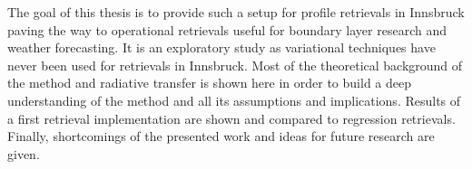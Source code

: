     The goal of this thesis is to provide such a setup for profile retrievals
    in Innsbruck paving the way to operational retrievals useful for boundary
    layer research and weather forecasting. It is an exploratory study as
    variational techniques have never been used for retrievals in Innsbruck.
    Most of the theoretical background of the method and radiative transfer
    is shown here in order to build a deep understanding of the method and all
    its assumptions and implications. Results of a first retrieval
    implementation are shown and compared to regression retrievals. Finally,
    shortcomings of the presented work and ideas for future research are
    given.

\stopsection

